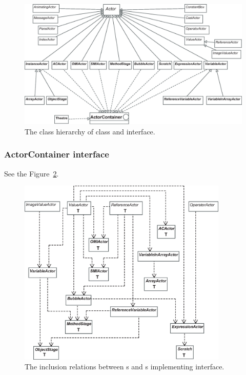 \begin{figure}[!htb]
\begin{center}
\includegraphics[width=\textwidth]{images/jeliot_actor_class_small.eps}
\caption{The class hierarchy of  class and  interface.}
\label{fig:class_hierarchy_of_Actor_class_small}
\end{center}
\end{figure}

\subsubsection{ActorContainer interface}

See the Figure~\ref{fig:actors_and_actorcontainers}.

\begin{figure}[!htb]
\begin{center}
\includegraphics[width=10cm]{images/actorcontainers_and_actors.eps}
\caption{The inclusion relations between s and s implementing  interface.}
\label{fig:actors_and_actorcontainers}
\end{center}
\end{figure}

